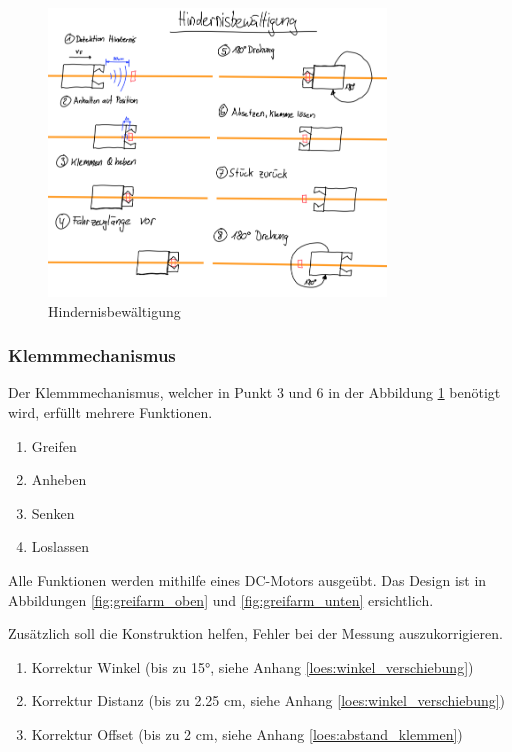 \documentclass[../main.tex]{subfiles}
\begin{document}
\begin{figure}[H]
\centering
\includegraphics[width=0.8\textwidth]{img/lösungskonzpet/Skizzen/Skizze_Hindernisbewältigung.png}
\caption{Hindernisbewältigung}
\label{img:Skizze_Hindernisbewältigung}
\end{figure}


\subsubsection{Klemmmechanismus}
Der Klemmmechanismus, welcher in Punkt 3 und 6 in der Abbildung \ref{img:Skizze_Hindernisbewältigung} benötigt wird, erfüllt mehrere Funktionen.

\begin{enumerate}
    \item Greifen
    \item Anheben
    \item Senken
    \item Loslassen
\end{enumerate}

Alle Funktionen werden mithilfe eines DC-Motors ausgeübt. Das Design ist in Abbildungen \ref{fig:greifarm_oben} und \ref{fig:greifarm_unten} ersichtlich.
\newline

Zusätzlich soll die Konstruktion helfen, Fehler bei der Messung auszukorrigieren.
\begin{enumerate}
    \item Korrektur Winkel (bis zu 15°, siehe Anhang \ref{loes:winkel_verschiebung})
    \item Korrektur Distanz (bis zu 2.25 cm, siehe Anhang \ref{loes:winkel_verschiebung})
    \item Korrektur Offset (bis zu 2 cm, siehe Anhang \ref{loes:abstand_klemmen})
\end{enumerate}
\end{document}
